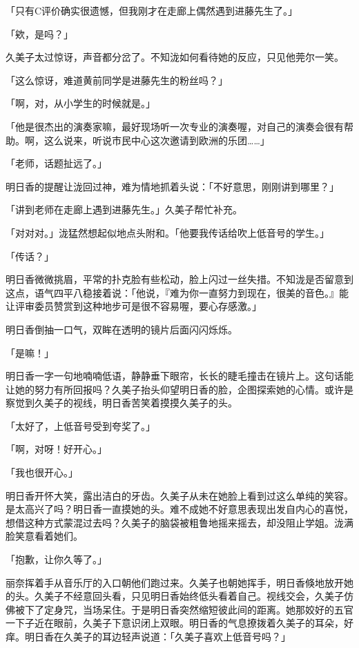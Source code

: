 \documentclass[UTF8]{ctexart}
\begin{document}
    「只有C评价确实很遗憾，但我刚才在走廊上偶然遇到进藤先生了。」 

    「欸，是吗？」 

    久美子太过惊讶，声音都分岔了。不知泷如何看待她的反应，只见他莞尔一笑。 

    「这么惊讶，难道黄前同学是进藤先生的粉丝吗？」 

    「啊，对，从小学生的时候就是。」 

    「他是很杰出的演奏家嘛，最好现场听一次专业的演奏喔，对自己的演奏会很有帮助。啊，这么说来，听说市民中心这次邀请到欧洲的乐团……」 

    「老师，话题扯远了。」 

    明日香的提醒让泷回过神，难为情地抓着头说：「不好意思，刚刚讲到哪里？」 

    「讲到老师在走廊上遇到进藤先生。」久美子帮忙补充。 

    「对对对。」泷猛然想起似地点头附和。「他要我传话给吹上低音号的学生。」 

    「传话？」 

    明日香微微挑眉，平常的扑克脸有些松动，脸上闪过一丝失措。不知泷是否留意到这点，语气四平八稳接着说：「他说，『难为你一直努力到现在，很美的音色。』能让评审委员赞赏到这种地步可是很不容易喔，要心存感激。」 

    明日香倒抽一口气，双眸在透明的镜片后面闪闪烁烁。 

    「是嘛！」 

    明日香一字一句地喃喃低语，静静垂下眼帘，长长的睫毛撞击在镜片上。这句话能让她的努力有所回报吗？久美子抬头仰望明日香的脸，企图探索她的心情。或许是察觉到久美子的视线，明日香苦笑着摸摸久美子的头。 

    「太好了，上低音号受到夸奖了。」 

    「啊，对呀！好开心。」 

    「我也很开心。」 

    明日香开怀大笑，露出洁白的牙齿。久美子从未在她脸上看到过这么单纯的笑容。是太高兴了吗？明日香一直摸她的头。难不成她不好意思表现出发自内心的喜悦，想借这种方式蒙混过去吗？久美子的脑袋被粗鲁地摇来摇去，却没阻止学姐。泷满脸笑意看着她们。 

    「抱歉，让你久等了。」 

    丽奈挥着手从音乐厅的入口朝他们跑过来。久美子也朝她挥手，明日香倏地放开她的头。久美子不经意回头看，只见明日香始终低头看着自己。视线交会，久美子仿佛被下了定身咒，当场呆住。于是明日香突然缩短彼此间的距离。她那姣好的五官一下子近在眼前，久美子下意识闭上双眼。明日香的气息撩拨着久美子的耳朵，好痒。明日香在久美子的耳边轻声说道：「久美子喜欢上低音号吗？」 
\end{document}
